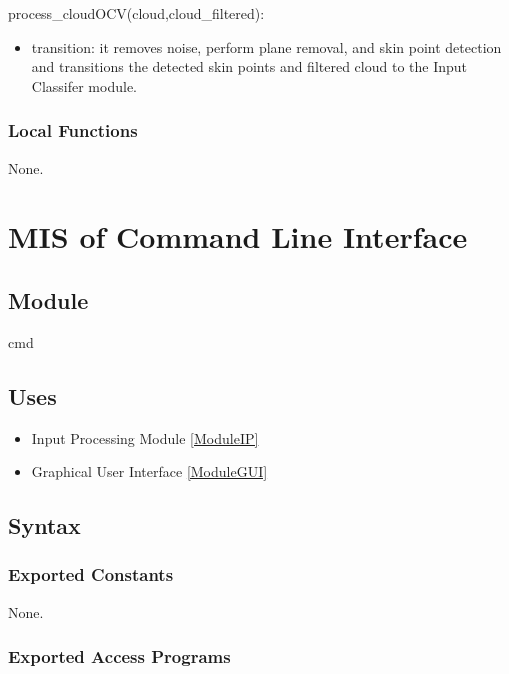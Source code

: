 \documentclass[12pt, titlepage]{article}
\begin{document}
\noindent process\_cloudOCV(cloud,cloud\_filtered):
\begin{itemize}
\item transition: it removes noise, perform plane removal, and skin point detection and transitions the detected skin points and filtered cloud to the Input Classifer module.
\end{itemize}


\subsubsection{Local Functions}

None.

\newpage

\section{MIS of Command Line Interface} \label{ModuleCLI} 

\subsection{Module}

cmd

\subsection{Uses}

\begin{itemize}
  \item Input Processing Module \ref{ModuleIP}
  \item Graphical User Interface \ref{ModuleGUI}
\end{itemize}



\subsection{Syntax}

\subsubsection{Exported Constants}

None.

\subsubsection{Exported Access Programs}
\end{document}

